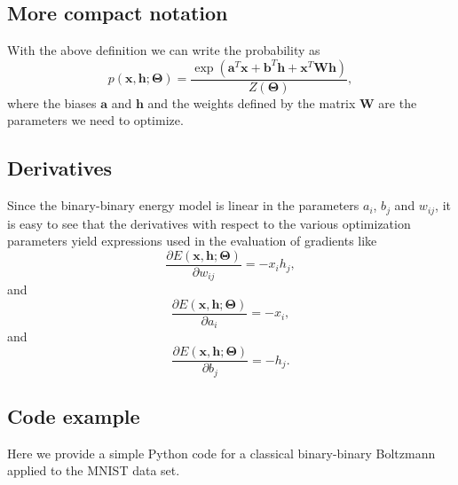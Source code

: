 \documentclass[%
oneside,                 %
final,                   %
10pt]{article}
\begin{document}
\subsection{More compact notation}

With the above definition we can write the probability as
\[
p(\bm{x},\bm{h};\bm{\Theta}) = \frac{\exp{(\bm{a}^T\bm{x}+\bm{b}^T\bm{h}+\bm{x}^T\bm{W}\bm{h})}}{Z(\bm{\Theta})},
\]
where the biases $\bm{a}$ and $\bm{h}$ and the weights defined by the matrix $\bm{W}$ are the parameters we need to optimize.

\subsection{Derivatives}

Since the binary-binary energy model is linear in the parameters $a_i$, $b_j$ and
$w_{ij}$, it is easy to see that the derivatives with respect to the
various optimization parameters yield expressions used in the
evaluation of gradients like
\[
\frac{\partial E(\bm{x}, \bm{h};\bm{\Theta})}{\partial w_{ij}}=-x_ih_j,
\]
and
\[
\frac{\partial E(\bm{x}, \bm{h};\bm{\Theta})}{\partial a_i}=-x_i,
\]
and
\[
\frac{\partial E(\bm{x}, \bm{h};\bm{\Theta})}{\partial b_j}=-h_j.
\]

\subsection{Code example}
Here we provide a simple Python code for a classical binary-binary Boltzmann applied to the MNIST data set.
\end{document}
